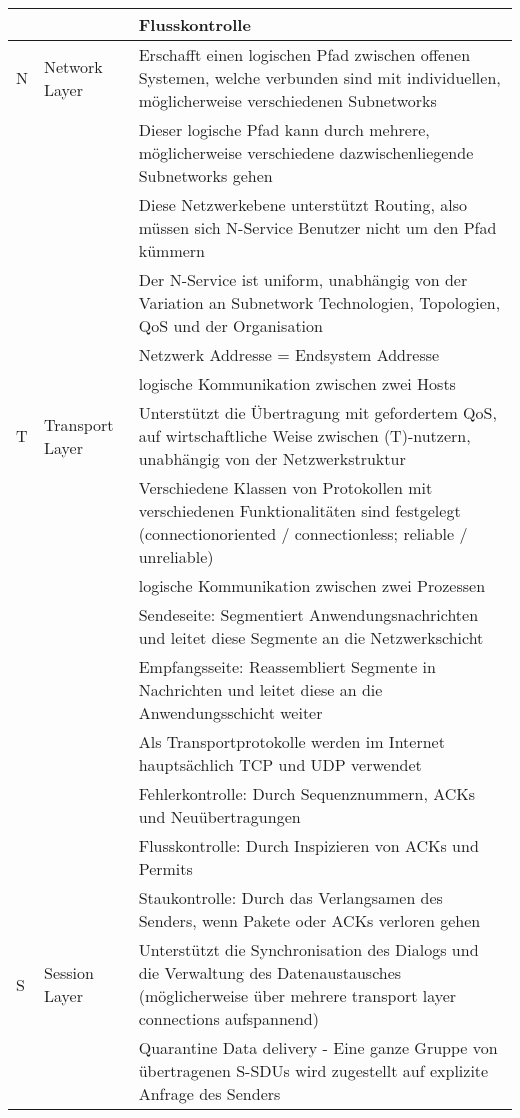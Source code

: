 \documentclass[10pt,landscape]{article}
\begin{document}
\begin{tabular}{l | l | l}
        && Flusskontrolle \\
        \hline
    N & Network Layer & 
        Erschafft einen logischen Pfad zwischen offenen Systemen, welche verbunden sind mit individuellen, möglicherweise verschiedenen Subnetworks\\
        &&Dieser logische Pfad kann durch mehrere, möglicherweise verschiedene dazwischenliegende Subnetworks gehen\\
        &&Diese Netzwerkebene unterstützt Routing, also müssen sich N-Service Benutzer nicht um den Pfad kümmern\\
        &&Der N-Service ist uniform, unabhängig von der Variation an Subnetwork Technologien, Topologien, QoS und der Organisation\\
        &&Netzwerk Addresse = Endsystem Addresse\\
        \hline
        && logische Kommunikation zwischen zwei Hosts \\
        \hline
    T & Transport Layer & 
        Unterstützt die Übertragung mit gefordertem QoS, auf wirtschaftliche Weise zwischen (T)-nutzern, unabhängig von der Netzwerkstruktur\\
        &&Verschiedene Klassen von Protokollen mit verschiedenen Funktionalitäten sind festgelegt (connectionoriented / connectionless; reliable / unreliable)\\
        \hline
        && logische Kommunikation zwischen zwei Prozessen \\
        && Sendeseite: Segmentiert Anwendungsnachrichten und leitet diese Segmente an die Netzwerkschicht \\
        && Empfangsseite: Reassembliert Segmente in Nachrichten und leitet diese an die Anwendungsschicht weiter \\
        && Als Transportprotokolle werden im Internet hauptsächlich TCP und UDP verwendet \\
        && Fehlerkontrolle: Durch Sequenznummern, ACKs und Neuübertragungen\\
        && Flusskontrolle: Durch Inspizieren von ACKs und Permits\\
        && Staukontrolle: Durch das Verlangsamen des Senders, wenn Pakete oder ACKs verloren gehen\\
        \hline
    S & Session Layer &
        Unterstützt die Synchronisation des Dialogs und die Verwaltung des Datenaustausches (möglicherweise über mehrere transport layer connections aufspannend)\\
        &&Quarantine Data delivery - Eine ganze Gruppe von übertragenen S-SDUs wird zugestellt auf explizite Anfrage des Senders\\

\end{tabular}
\end{document}
